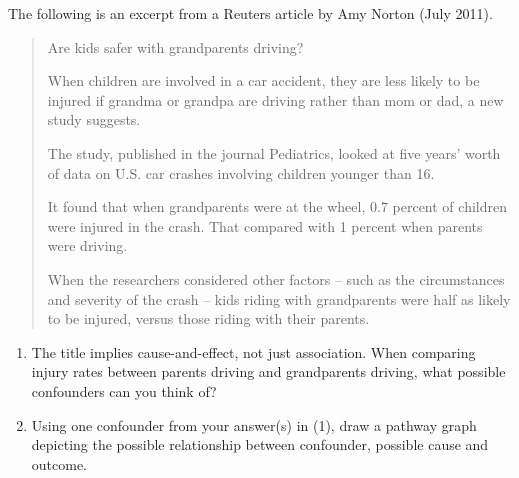 \documentclass[11pt]{book}\usepackage[]{graphicx}\usepackage[]{color}
\begin{document}
\begin{exercises}
\begin{exercise}
\begin{center}
\end{center}

The following is an excerpt from a Reuters article by Amy Norton (July 2011).

\begin{quotation}

Are kids safer with grandparents driving?

When children are involved in a car accident, they are less likely to be injured if grandma or grandpa are driving rather than mom or dad, a new study suggests.

The study, published in the journal Pediatrics, looked at five years' worth of data on U.S. car crashes involving children younger than 16.

It found that when grandparents were at the wheel, 0.7 percent of children were injured in the crash. That compared with 1 percent when parents were driving.

When the researchers considered other factors -- such as the circumstances and severity of the crash -- kids riding with grandparents were half as likely to be injured, versus those riding with their parents.

\end{quotation}

\begin{enumerate}
  \item The title implies cause-and-effect, not just association.  When comparing injury rates between parents driving and grandparents driving, what possible    confounders can you think of?
  \item Using one confounder from your answer(s) in (1), draw a pathway graph depicting the possible relationship between confounder, possible cause and outcome.
\end{enumerate}
\end{exercise}
\begin{solution}  %


\end{solution}
\end{exercises}
\end{document}
